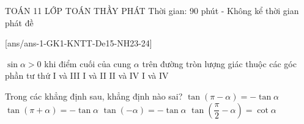 \begin{name}
	{\tenchude}
	{TOÁN 11}
	{LỚP TOÁN THẦY PHÁT}
	{Thời gian: 90 phút - Không kể thời gian phát đề}
\end{name}
\TN
{}[ans/ans-1-GK1-KNTT-De15-NH23-24]

\begin{ex}%
	$\sin\alpha>0$ khi điểm cuối của cung $\alpha$ trên đường tròn lượng giác thuộc các góc phần tư thứ
	\choice
	{I và III}
	{\True I và II}
	{II và IV}
	{I và IV}
\end{ex}
	\begin{ex}%
	Trong các khẳng định sau, khẳng định nào sai?
	\choice
	{$\tan\left(\pi-\alpha\right)=-\tan\alpha$}
	{\True $\tan\left(\pi+\alpha\right)=-\tan\alpha$}
	{$\tan\left(-\alpha\right)=-\tan\alpha$}
	{$\tan\left(\dfrac{\pi}{2}-\alpha\right)=\cot\alpha$}
\end{ex}

